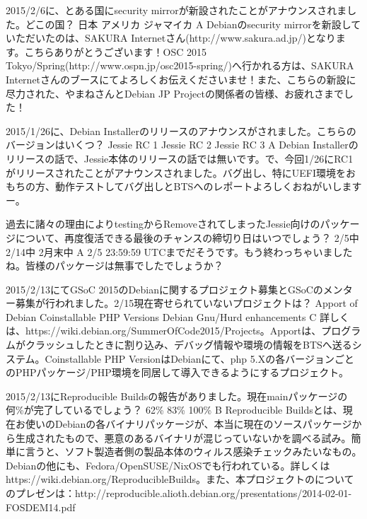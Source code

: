 %

\santaku
{2015/2/6に、とある国にsecurity mirrorが新設されたことがアナウンスされました。どこの国？}
{日本}
{アメリカ}
{ジャマイカ}
{A}
{Debianのsecurity mirrorを新設していただいたのは、SAKURA Internetさん(http://www.sakura.ad.jp/)となります。こちらありがとうございます！OSC 2015 Tokyo/Spring(http://www.ospn.jp/osc2015-spring/)へ行かれる方は、SAKURA Internetさんのブースにてよろしくお伝えくださいませ！また、こちらの新設に尽力された、やまねさんとDebian JP Projectの関係者の皆様、お疲れさまでした！}

\santaku
{2015/1/26に、Debian Installerのリリースのアナウンスがされました。こちらのバージョンはいくつ？}
{Jessie RC 1}
{Jessie RC 2}
{Jessie RC 3}
{A}
{Debian Installerのリリースの話で、Jessie本体のリリースの話では無いです。で、今回1/26にRC1がリリースされたことがアナウンスされました。バグ出し、特にUEFI環境をおもちの方、動作テストしてバグ出しとBTSへのレポートよろしくおねがいしますー。}

\santaku
{過去に諸々の理由によりtestingからRemoveされてしまったJessie向けのパッケージについて、再度復活できる最後のチャンスの締切り日はいつでしょう？}
{2/5中}
{2/14中}
{2月末中}
{A}
{2/5 23:59:59 UTCまでだそうです。もう終わっちゃいましたね。皆様のパッケージは無事でしたでしょうか？}

\santaku
{2015/2/13にてGSoC 2015のDebianに関するプロジェクト募集とGSoCのメンター募集が行われました。2/15現在寄せられていないプロジェクトは？}
{Apport of Debian}
{Coinstallable PHP Versions}
{Debian Gnu/Hurd enhancements}
{C}
{詳しくは、https://wiki.debian.org/SummerOfCode2015/Projects。Apportは、プログラムがクラッシュしたときに割り込み、デバッグ情報や環境の情報をBTSへ送るシステム。Coinstallable PHP VersionはDebianにて、php 5.Xの各バージョンごとのPHPパッケージ/PHP環境を同居して導入できるようにするプロジェクト。}

\santaku
{2015/2/13にReproducible Buildsの報告がありました。現在mainパッケージの何\%が完了しているでしょう？}
{62\%}
{83\%}
{100\%}
{B}
{Reproducible Buildsとは、現在お使いのDebianの各バイナリパッケージが、本当に現在のソースパッケージから生成されたもので、悪意のあるバイナリが混じっていないかを調べる試み。簡単に言うと、ソフト製造者側の製品本体のウィルス感染チェックみたいなもの。Debianの他にも、Fedora/OpenSUSE/NixOSでも行われている。詳しくは https://wiki.debian.org/ReproducibleBuilds。また、本プロジェクトのについてのプレゼンは：http://reproducible.alioth.debian.org/presentations/2014-02-01-FOSDEM14.pdf}
